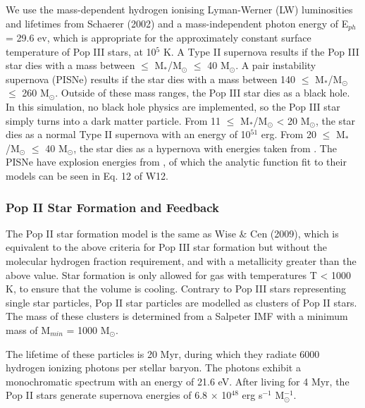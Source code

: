 \documentclass[a4paper,fleqn,usenatbib]{mnras}
\begin{document}
We use the mass-dependent hydrogen ionising Lyman-Werner (LW) luminosities and lifetimes from Schaerer (2002) and a mass-independent photon energy of E$_{ph}$ = 29.6 ev, which is appropriate for the approximately constant surface temperature of Pop III stars, at 10$^{5}$ K. A Type II supernova results if the Pop III star dies with a mass between $\leq$ M$_{\ast}$/M$_{\odot}$ $\leq$ 40 M$_{\odot}$. A pair instability supernova (PISNe) results if the star dies with a mass between 140 $\leq$ M$_{\ast}$/M$_{\odot}$ $\leq$ 260 M$_{\odot}$. Outside of these mass ranges, the Pop III star dies as a black hole. In this simulation, no black hole physics are implemented, so the Pop III star simply turns into a dark matter particle. 
From 11 $\leq$ M$_{\ast}$/M$_{\odot}$ < 20 M$_{\odot}$, the star dies as a normal Type II supernova with an energy of 10$^{51}$ erg. From 20 $\leq$ M$_{\ast}$/M$_{\odot}$ $\leq$ 40 M$_{\odot}$, the star dies as a hypernova with energies taken from \citet{Nomoto06}.
The PISNe have explosion energies from \citet{2002ApJ...567..532H}, of which the analytic function fit to their models can be seen in Eq. 12 of W12. 

\subsubsection{Pop II  Star Formation and Feedback}
The Pop II star formation model is the same as Wise \& Cen (2009), which is equivalent to the above criteria for Pop III star formation but without the molecular hydrogen fraction requirement, and with a metallicity greater than the above value. Star formation is only allowed for gas with temperatures T < 1000 K, to ensure that the volume is cooling. Contrary to Pop III stars representing single star particles, Pop II star particles are modelled as clusters of Pop II stars. The mass of these clusters is determined from a Salpeter IMF with a minimum mass of M$_{min}$ = 1000 M$_{\odot}$. 

The lifetime of these particles is 20 Myr, during which they radiate 6000 hydrogen ionizing photons per stellar baryon. The photons exhibit a monochromatic spectrum with an energy of 21.6 eV. After living for 4 Myr, the Pop II stars generate supernova energies of 6.8 $\times$ 10$^{48}$ erg s$^{-1}$ M$_{\odot}^{-1}$.

\end{document}
